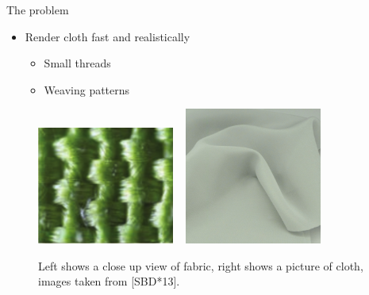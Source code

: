 \documentclass{beamer}
\begin{document}

\begin{frame}{The problem}
\begin{itemize}
\setlength\itemsep{0.5em}
\item Render cloth fast and realistically 
		\begin{itemize}
		\setlength\itemsep{0.5em}
		\item Small threads
		\item Weaving patterns
		\end{itemize}
\end{itemize}
\begin{figure}[t!]
\begin{center}
\includegraphics[width=0.4\textwidth]{img/cloth_real} 
~
\includegraphics[width=0.4\textwidth]{img/cloth_reference}
\caption*{\tiny{Left shows a close up view of fabric, right shows a picture of cloth, images taken from [SBD*13].}}
\end{center}
\end{figure}
\end{frame}
\end{document}
